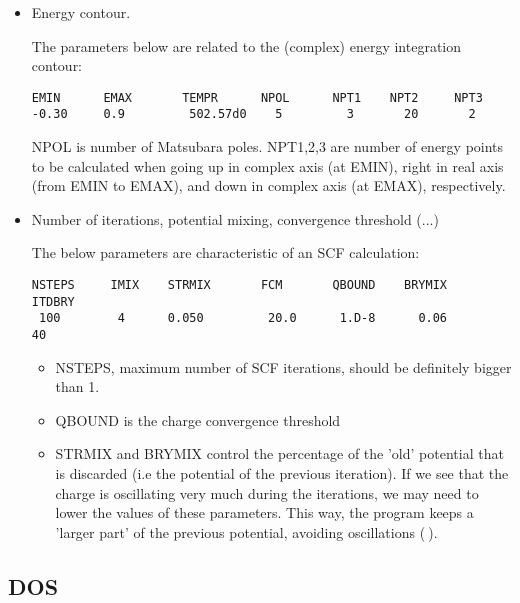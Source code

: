 \documentclass[11pt,fleqn]{book} %
\begin{document}
\begin{itemize}

\item Energy contour.

The parameters below are related to the (complex) energy integration contour:
\begin{VBox}
\begin{verbatim}
EMIN      EMAX       TEMPR      NPOL      NPT1    NPT2     NPT3
-0.30     0.9         502.57d0    5         3       20       2
\end{verbatim}
\end{VBox}
NPOL is number of Matsubara poles. NPT1,2,3 are number of energy points
to be calculated when going up in complex axis (at EMIN),
right in real axis (from EMIN to EMAX), and down in complex axis (at EMAX), respectively.



\item Number of iterations, potential mixing, convergence threshold (...)

The below parameters are characteristic of an SCF calculation:
\begin{VBox}
\begin{verbatim}
NSTEPS     IMIX    STRMIX       FCM       QBOUND    BRYMIX      ITDBRY
 100        4      0.050         20.0      1.D-8      0.06        40
\end{verbatim}
\end{VBox}

\begin{itemize}
\item NSTEPS, maximum number of SCF iterations, should be definitely bigger than 1.
\item QBOUND is the charge convergence threshold
\item STRMIX and BRYMIX control the percentage of the 'old' potential that is discarded
(i.e the potential of the previous iteration).
If we see that the charge is oscillating very much during the iterations, we may need to lower
the values of these parameters. This way, the program keeps a 'larger part' of the previous potential,
avoiding oscillations ($~$).
\end{itemize}




\end{itemize}

\subsection{DOS}
\end{document}
